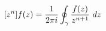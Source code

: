 \documentclass[preview]{standalone}
\begin{document}
\begin{align*}
\special{dvisvgm:raw <g id='unique000'>}[z^n]f(z) = \frac{1}{2\pi i}\oint_{\gamma} \frac{f(z)}{z^{n+1}}~dz\special{dvisvgm:raw </g>}
\end{align*}
\end{document}
